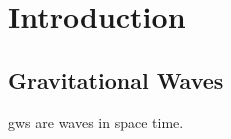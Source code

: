 \chapter{Introduction}
\label{chap:intro}
\chaptoc{}
\newpage

\section{Gravitational Waves}
\label{sec:gws}

\glspl{gw} are waves in space time.

\lipsum[1-9] %
